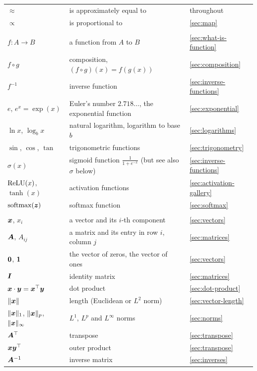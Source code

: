 \begin{longtable}{@{}>{\raggedright\arraybackslash}p{3.6cm}
                   >{\raggedright\arraybackslash}p{7.3cm}
                   >{\raggedright\arraybackslash}p{3.0cm}@{}}
$\approx$ & is approximately equal to & throughout\\
$\propto$ & is proportional to & \cref{sec:map}\\
\addlinespace
\multicolumn{3}{@{}l}{\textbf{\color{MLchapter}Functions}}\\
$f\colon A \to B$ & a function from $A$ to $B$ & \cref{sec:what-is-function}\\
$f \circ g$ & composition, $(f \circ g)(x) = f(g(x))$ & \cref{sec:composition}\\
$f^{-1}$ & inverse function & \cref{sec:inverse-functions}\\
$e$, $e^x = \exp(x)$ & Euler's number $2.718\ldots$, the exponential function & \cref{sec:exponential}\\
$\ln x$, $\log_bx$ & natural logarithm, logarithm to base $b$ & \cref{sec:logarithms}\\
$\sin$, $\cos$, $\tan$ & trigonometric functions & \cref{sec:trigonometry}\\
$\sigma(x)$ & sigmoid function $\frac{1}{1 + e^{-x}}$ (but see also $\sigma$ below) & \cref{sec:inverse-functions}\\
$\operatorname{ReLU}(x)$, $\tanh(x)$ & activation functions & \cref{sec:activation-gallery}\\
$\operatorname{softmax}(\bm{z})$ & softmax function & \cref{sec:softmax}\\
\addlinespace
\multicolumn{3}{@{}l}{\textbf{\color{MLchapter}Linear algebra}}\\
$\bm{x}$, $x_i$ & a vector and its $i$-th component & \cref{sec:vectors}\\
$\bm{A}$, $A_{ij}$ & a matrix and its entry in row $i$, column $j$ & \cref{sec:matrices}\\
$\bm{0}$, $\bm{1}$ & the vector of zeros, the vector of ones & \cref{sec:vectors}\\
$\bm{I}$ & identity matrix & \cref{sec:matrices}\\
$\bm{x}\cdot\bm{y} = \bm{x}^\top\bm{y}$ & dot product & \cref{sec:dot-product}\\
$\lVert\bm{x}\rVert$ & length (Euclidean or $L^2$ norm) & \cref{sec:vector-length}\\
$\lVert\bm{x}\rVert_1$, $\lVert\bm{x}\rVert_p$, $\lVert\bm{x}\rVert_\infty$ & $L^1$, $L^p$ and $L^\infty$ norms & \cref{sec:norms}\\
$\bm{A}^\top$ & transpose & \cref{sec:transpose}\\
$\bm{x}\bm{y}^\top$ & outer product & \cref{sec:transpose}\\
$\bm{A}^{-1}$ & inverse matrix & \cref{sec:inverses}\\

\end{longtable}
